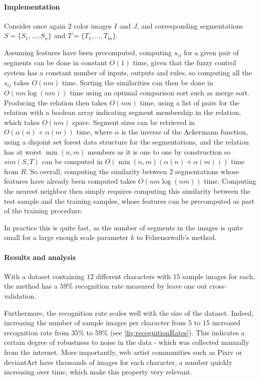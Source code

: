 \paragraph{Implementation}
Consider once again $2$ color images $I$ and $J$, and corresponding segmentations $S = \{S_1, ..., S_n\}$ and $T = \{T_1, ..., T_m\}$.

Assuming features have been precomputed, computing $s_{ij}$ for a given pair of segments can be done in constant $O(1)$ time, given that the fuzzy control system has a constant number of inputs, outputs and rules, so computing all the $s_{ij}$ takes $O(nm)$ time. Sorting the similarities can then be done in $O(nm\log(nm))$ time using an optimal comparison sort such as merge sort. Producing the relation then takes $O(nm)$ time, using a list of pairs for the relation with a boolean array indicating segment membership in the relation, which takes $O(nm)$ space. Segment sizes can be retrieved in $O(\alpha(n) + \alpha(m))$ time, where $\alpha$ is the inverse of the Ackermann function, using a disjoint set forest data structure for the segmentations, and the relation has at worst $\min(n,m)$ members as it is one to one by construction so $sim(S,T)$ can be computed in $O(\min(n,m)(\alpha(n) + \alpha(m)))$ time from $R$. So overall, computing the similarity between $2$ segmentations whose features have already been computed takes $O(nm\log(nm))$ time. Computing the nearest neighbor then simply requires computing this similarity between the test sample and the training samples, whose features can be precomputed as part of the training procedure.

In practice this is quite fast, as the number of segments in the images is quite small for a large enough scale parameter $k$ to Felzenszwalb's method.

\paragraph{Results and analysis}
With a dataset containing $12$ different characters with $15$ sample images for each, the method has a $59$\% recognition rate measured by leave one out cross-validation.

Furthermore, the recognition rate scales well with the size of the dataset. Indeed, increasing the number of sample images per character from $5$ to $15$ increased recognition rate from $35$\% to $59$\% (see \autoref{fig:recognitionRates}). This indicates a certain degree of robustness to noise in the data - which was collected manually from the internet. More importantly, web artist communities such as Pixiv or deviantArt have thousands of images for each character, a number quickly increasing over time, which make this property very relevant.

